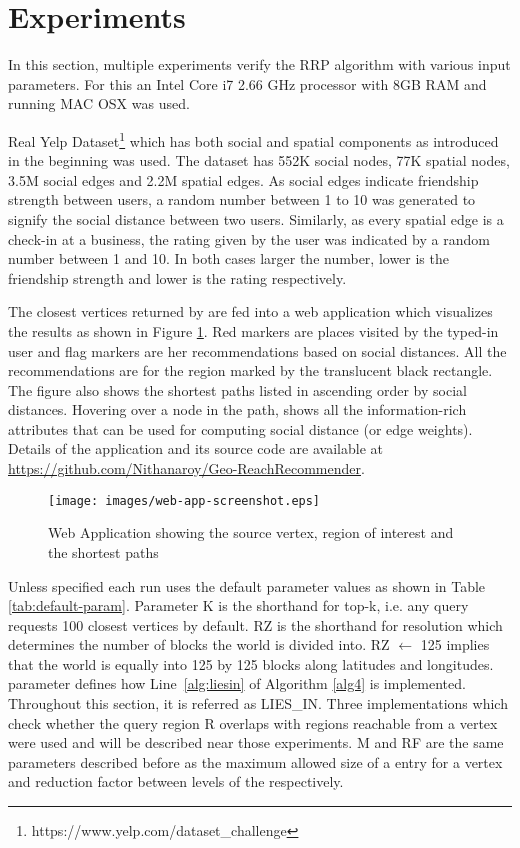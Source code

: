 \section{Experiments} \label{sec:experiment}

In this section, multiple experiments verify the RRP algorithm with various input parameters. For this an Intel Core i7 2.66 GHz processor with 8GB RAM and running MAC OSX was used. 

Real Yelp Dataset\footnote{https://www.yelp.com/dataset\_challenge} which has both social and spatial components as introduced in the beginning was used. The dataset has 552K social nodes, 77K spatial nodes, 3.5M social edges and 2.2M spatial edges. As social edges indicate friendship strength between users, a random number between 1 to 10 was generated to signify the social distance between two users. Similarly, as every spatial edge is a check-in at a business, the rating given by the user was indicated by a random number between 1 and 10. In both cases larger the number, lower is the friendship strength and lower is the rating respectively. 

The closest vertices returned by {\rrp} are fed into a web application which visualizes the results as shown in Figure \ref{fig:web-app}. Red markers are places visited by the typed-in user and flag markers are her recommendations based on social distances. All the recommendations are for the region marked by the translucent black rectangle. The figure also shows the shortest paths listed in ascending order by social distances. Hovering over a node in the path, shows all the information-rich attributes that can be used for computing social distance (or edge weights). Details of the application and its source code are available at \href{https://github.com/Nithanaroy/GeoReachRecommender}{https://github.com/Nithanaroy/Geo-ReachRecommender}.

\begin{figure}[t]
	\centering \texttt{[image: images/web-app-screenshot.eps]}
    \caption{Web Application showing the source vertex, region of interest and the shortest paths}
    \label{fig:web-app}
\end{figure}

Unless specified each run uses the default parameter values as shown in Table \ref{tab:default-param}. Parameter K is the shorthand for top-k, i.e. any query requests 100 closest vertices by default. RZ is the shorthand for resolution which determines the number of blocks the world is divided into. RZ $\gets$ 125 implies that the world is equally into 125 by 125 blocks along latitudes and longitudes. \textit{{\vra}} parameter defines how Line~\ref{alg:liesin} of Algorithm \ref{alg4} is implemented. Throughout this section, it is referred as LIES\_IN. Three implementations which check whether the query region R overlaps with regions reachable from a vertex were used and will be described near those experiments. M and RF are the same parameters described before as the maximum allowed size of a {\rrpspatial} entry for a vertex and reduction factor between levels of the {\rrpspatial} respectively.

